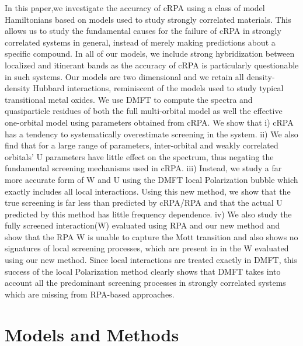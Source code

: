 \documentclass[10pt]{ruthesis}
\begin{document}
{In this paper,we investigate the accuracy of cRPA using a class of model Hamiltonians based on models used to study strongly correlated materials. This allows us to  study the fundamental causes for the failure of cRPA in strongly correlated systems in general, instead of merely making predictions about a specific compound. %
In all of our models, we include strong hybridization between localized and itinerant bands as the accuracy of cRPA is particularly questionable in such systems. Our models are two dimensional and we retain all density-density Hubbard interactions, reminiscent of the models used to study typical transitional metal oxides. 
We use DMFT to compute the spectra and quasiparticle residues of both the full multi-orbital model as well the effective one-orbital model using parameters obtained from cRPA. We show that \textrm{i)} cRPA has a tendency to systematically overestimate screening in the system. \textrm{ii)} We also find that for a large range of parameters, inter-orbital and weakly correlated orbitals' U parameters have little effect on the spectrum, thus negating the fundamental screening mechanisms used in cRPA. \textrm{iii}) Instead, we study a far more accurate form of W and U using the DMFT local Polarization bubble which exactly includes all local interactions. Using this new method, we show that the true screening is far less than predicted by cRPA/RPA and that the actual U predicted by this method has little frequency dependence. \textrm{iv)} We also study the fully screened interaction(W) evaluated using RPA and our new method and show that the RPA W is unable to capture the Mott transition and also shows no signatures of local screening processes, which are present in in the W evaluated using our new method. Since local interactions are treated exactly in DMFT, this success of the local Polarization method clearly shows that DMFT takes into account all the predominant screening processes in strongly correlated systems which are missing from RPA-based approaches. 


\section{Models and Methods}
}
\end{document}
